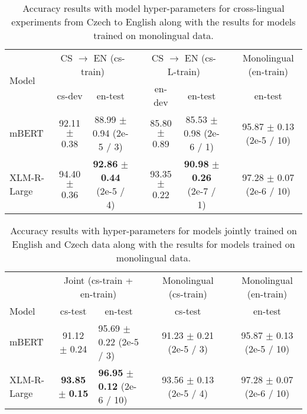 \documentclass[10pt, a4paper]{article}
\begin{document}
\begin{table*}[ht!]
\begin{adjustbox}{width=0.95\linewidth,center}
\begin{tabular}{lccccccc} \toprule
 \multirow{2}{*}{Model}             & \multicolumn{2}{c}{CS $\rightarrow$ EN (cs-train)} & & \multicolumn{2}{c}{CS $\rightarrow$ EN (cs-L-train)}  & & \multicolumn{1}{c}{Monolingual (en-train)} \\ \cline{2-3} \cline{5-6} \cline{8-8}
     & cs-dev           & en-test    &      & en-dev           & en-test       &  & en-test         \\ \midrule
mBERT & 92.11 $\pm$ 0.38     & 88.99 $\pm$ 0.94 \footnotesize{(2e-5 / 3)} &      &        85.80 $\pm$ 0.89                   &    85.53 $\pm$ 0.98  \footnotesize{(2e-6 / 1)}           & &  95.87 $\pm$ 0.13  \footnotesize{(2e-5 / 10)}   \\
XLM-R-Large & 94.40 $\pm$ 0.36     & \textbf{92.86} $\pm$ \textbf{0.44} \footnotesize{(2e-5 / 4)} & &         93.35 $\pm$ 0.22                     &       \textbf{90.98} $\pm$ \textbf{0.26}   \footnotesize{(2e-7 / 1)}           &  &  97.28 $\pm$ 0.07 \footnotesize{(2e-6 / 10)} \\ \bottomrule
\end{tabular}
\end{adjustbox}
\caption{Accuracy results with model hyper-parameters for cross-lingual experiments from Czech to English along with the results for models trained on monolingual data.} \label{tab:hyper-crosslingual-cs-en}
\end{table*}

\begin{table*}[t]
\begin{adjustbox}{width=0.90\linewidth,center}
\begin{tabular}{lclcccc} \toprule
            & \multicolumn{2}{c}{Joint (cs-train + en-train)} && \multicolumn{1}{c}{Monolingual (cs-train)} &&  Monolingual (en-train) \\ \cline{2-3} \cline{5-5} \cline{7-7}
Model       & cs-test        & \multicolumn{1}{c}{en-test}       && cs-test            && en-test             \\ \midrule
mBERT       & 91.12 $\pm$ 0.24   & 95.69 $\pm$ 0.22 \footnotesize{(2e-5 / 3)}  && 91.23 $\pm$ 0.21 \footnotesize{(2e-5 / 3)} && 95.87 $\pm$ 0.13 \footnotesize{(2e-5 / 10)} \\
XLM-R-Large & \textbf{93.85} $\pm$ \textbf{0.15}   & \textbf{96.95} $\pm$ \textbf{0.12} \footnotesize{(2e-6 / 10)}  && 93.56 $\pm$ 0.13 \footnotesize{(2e-5 / 4)} && 97.28 $\pm$ 0.07 \footnotesize{(2e-6 / 10)} \\ \bottomrule
\end{tabular}
\end{adjustbox}
\caption{Accuracy results with hyper-parameters for models jointly trained on English and Czech data along with the results for models trained on monolingual data.} \label{tab:hyper-crosslingual-joint}
\end{table*}
\end{document}
